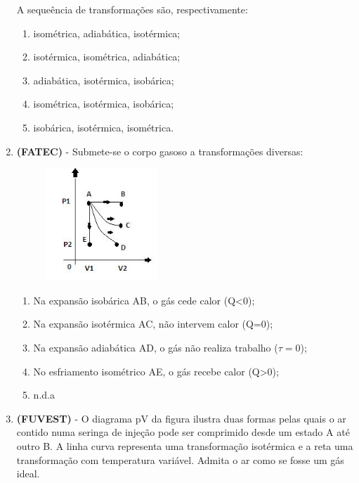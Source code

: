 \documentclass[12pt,letterpaper,fleqn]{article}
\begin{document}
\begin{enumerate}
    A sequeência de transformações são, respectivamente:
    \begin{enumerate}
        \item isométrica, adiabática, isotérmica;
        \item isotérmica, isométrica, adiabática;
        \item adiabática, isotérmica, isobárica;
        \item isométrica, isotérmica, isobárica;
        \item isobárica, isotérmica, isométrica.
    \end{enumerate}
    
    \item \textbf{(FATEC)} - Submete-se o corpo gasoso a transformações diversas:
    \begin{figure}[h]
        \centering
        \includegraphics[width=0.4\textwidth]{fatec.png}
    \end{figure}
    
    
    \begin{enumerate}
        \item Na expansão isobárica AB, o gás cede calor (Q<0);
        \item Na expansão isotérmica AC, não intervem calor (Q=0);
        \item Na expansão adiabática AD, o gás não realiza trabalho ($\tau=0$);
        \item No esfriamento isométrico AE, o gás recebe calor (Q>0);
        \item n.d.a
    \end{enumerate}
    
    \item \textbf{(FUVEST)} - O diagrama pV da figura ilustra duas formas pelas quais o ar contido numa seringa de injeção pode ser comprimido desde um estado A até outro B. A linha curva representa uma transformação isotérmica e a reta uma transformação com temperatura variável. Admita o ar como se fosse um gás ideal.
    

\end{enumerate}
\end{document}
